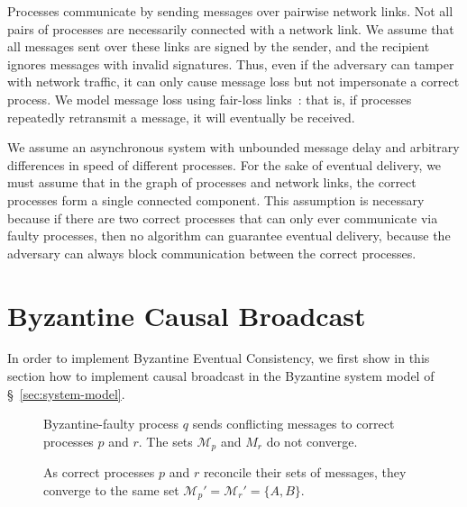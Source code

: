 \documentclass[a4paper,anonymous,USenglish]{lipics-v2019}
\begin{document}
Processes communicate by sending messages over pairwise network links.
Not all pairs of processes are necessarily connected with a network link.
We assume that all messages sent over these links are signed by the sender, and the recipient ignores messages with invalid signatures.
Thus, even if the adversary can tamper with network traffic, it can only cause message loss but not impersonate a correct process.
We model message loss using fair-loss links~\cite{Cachin:2011wt}: that is, if processes repeatedly retransmit a message, it will eventually be received.

We assume an asynchronous system with unbounded message delay and arbitrary differences in speed of different processes.
For the sake of eventual delivery, we must assume that in the graph of processes and network links, the correct processes form a single connected component.
This assumption is necessary because if there are two correct processes that can only ever communicate via faulty processes, then no algorithm can guarantee eventual delivery, because the adversary can always block communication between the correct processes.




\section{Byzantine Causal Broadcast}\label{sec:algorithm}

In order to implement Byzantine Eventual Consistency, we first show in this section how to implement causal broadcast in the Byzantine system model of \S~\ref{sec:system-model}.

\begin{figure}
\centering
\begin{minipage}{.5\textwidth}
    \centering
    
    \captionsetup{width=.95\linewidth}
    \caption{Byzantine-faulty process $q$ sends conflicting messages to correct processes $p$ and $r$.
    The sets $\mathcal{M}_p$ and ${M}_r$ do not converge.}
    \label{fig:trivial1}
\end{minipage}%
\begin{minipage}{.5\textwidth}
    \centering
    
    \captionsetup{width=.95\linewidth}
    \caption{As correct processes $p$ and $r$ reconcile their sets of messages, they converge to the same set $\mathcal{M}_p' = \mathcal{M}_r' = \{A,B\}$.}
    \label{fig:trivial2}
\end{minipage}
\end{figure}
\end{document}
